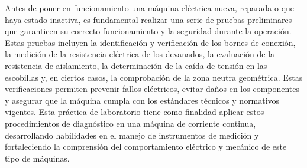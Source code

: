  Antes de poner en funcionamiento una máquina eléctrica nueva, reparada o que haya estado inactiva, es fundamental realizar una serie de pruebas preliminares que garanticen su correcto funcionamiento y la seguridad durante la operación. Estas pruebas incluyen la identificación y verificación de los bornes de conexión, la medición de la resistencia eléctrica de los devanados, la evaluación de la resistencia de aislamiento, la determinación de la caída de tensión en las escobillas y, en ciertos casos, la comprobación de la zona neutra geométrica. Estas verificaciones permiten prevenir fallos eléctricos, evitar daños en los componentes y asegurar que la máquina cumpla con los estándares técnicos y normativos vigentes.
 Esta práctica de laboratorio tiene como finalidad aplicar estos procedimientos de diagnóstico en una máquina de corriente continua, desarrollando habilidades en el manejo de instrumentos de medición y fortaleciendo la comprensión del comportamiento eléctrico y mecánico de este tipo de máquinas. 